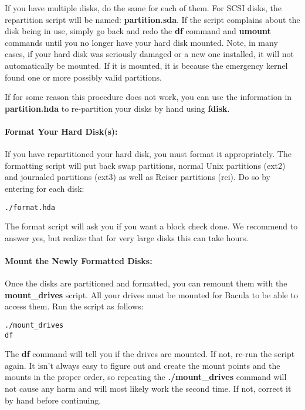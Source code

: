 If you have multiple disks, do the same for each of them. For SCSI disks, the
repartition script will be named: {\bf partition.sda}. If the script complains
about the disk being in use, simply go back and redo the {\bf df} command and
{\bf umount} commands until you no longer have your hard disk mounted. Note,
in many cases, if your hard disk was seriously damaged or a new one installed,
it will not automatically be mounted. If it is mounted, it is because the
emergency kernel found one or more possibly valid partitions. 

If for some reason this procedure does not work, you can use the information
in {\bf partition.hda} to re-partition your disks by hand using {\bf fdisk}. 

\paragraph*{Format Your Hard Disk(s):}

If you have repartitioned your hard disk, you must format it appropriately.
The formatting script will put back swap partitions, normal Unix partitions
(ext2) and journaled partitions (ext3) as well as Reiser partitions (rei). Do
so by entering for each disk: 

\footnotesize
\begin{verbatim}
./format.hda
\end{verbatim}
\normalsize

The format script will ask you if you want a block check done. We recommend to
answer yes, but realize that for very large disks this can take hours. 

\paragraph*{Mount the Newly Formatted Disks:}

Once the disks are partitioned and formatted, you can remount them with the
{\bf mount\_drives} script. All your drives must be mounted for Bacula to be
able to access them. Run the script as follows: 

\footnotesize
\begin{verbatim}
./mount_drives
df
\end{verbatim}
\normalsize

The {\bf df} command will tell you if the drives are mounted. If not, re-run
the script again. It isn't always easy to figure out and create the mount
points and the mounts in the proper order, so repeating the {\bf
./mount\_drives} command will not cause any harm and will most likely work the
second time. If not, correct it by hand before continuing. 

